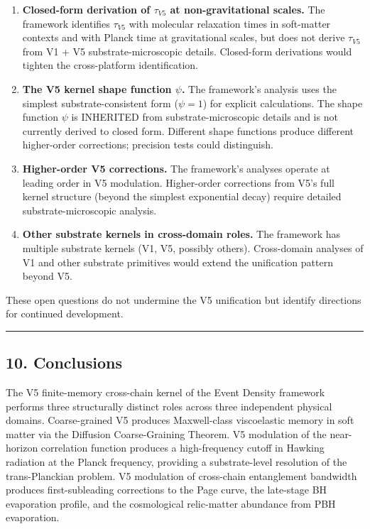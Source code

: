 \documentclass[
  11pt,
  a4paperpaper,
]{article}
\begin{document}
\begin{enumerate}
\def\labelenumi{\arabic{enumi}.}
\item
  \textbf{Closed-form derivation of \(\tau_{V5}\) at non-gravitational
  scales.} The framework identifies \(\tau_{V5}\) with molecular
  relaxation times in soft-matter contexts and with Planck time at
  gravitational scales, but does not derive \(\tau_{V5}\) from V1 + V5
  substrate-microscopic details. Closed-form derivations would tighten
  the cross-platform identification.
\item
  \textbf{The V5 kernel shape function \(\psi\).} The framework's
  analysis uses the simplest substrate-consistent form (\(\psi = 1\))
  for explicit calculations. The shape function \(\psi\) is INHERITED
  from substrate-microscopic details and is not currently derived to
  closed form. Different shape functions produce different higher-order
  corrections; precision tests could distinguish.
\item
  \textbf{Higher-order V5 corrections.} The framework's analyses operate
  at leading order in V5 modulation. Higher-order corrections from V5's
  full kernel structure (beyond the simplest exponential decay) require
  detailed substrate-microscopic analysis.
\item
  \textbf{Other substrate kernels in cross-domain roles.} The framework
  has multiple substrate kernels (V1, V5, possibly others). Cross-domain
  analyses of V1 and other substrate primitives would extend the
  unification pattern beyond V5.
\end{enumerate}

These open questions do not undermine the V5 unification but identify
directions for continued development.

\begin{center}\rule{0.5\linewidth}{0.5pt}\end{center}

\subsection{10. Conclusions}\label{conclusions}

The V5 finite-memory cross-chain kernel of the Event Density framework
performs three structurally distinct roles across three independent
physical domains. Coarse-grained V5 produces Maxwell-class viscoelastic
memory in soft matter via the Diffusion Coarse-Graining Theorem. V5
modulation of the near-horizon correlation function produces a
high-frequency cutoff in Hawking radiation at the Planck frequency,
providing a substrate-level resolution of the trans-Planckian problem.
V5 modulation of cross-chain entanglement bandwidth produces
first-subleading corrections to the Page curve, the late-stage BH
evaporation profile, and the cosmological relic-matter abundance from
PBH evaporation.
\end{document}
